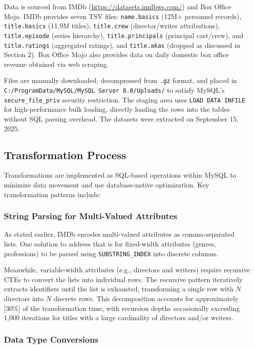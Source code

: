 Data is sourced from IMDb (\url{https://datasets.imdbws.com/}) and Box Office Mojo. IMDb provides seven TSV files: \texttt{name.basics} (12M+ personnel records), \texttt{title.basics} (11.9M titles), \texttt{title.crew} (director/writer attributions), \texttt{title.episode} (series hierarchy), \texttt{title.principals} (principal cast/crew), and \texttt{title.ratings} (aggregated ratings), and \texttt{title.akas} (dropped as discussed in Section 2). Box Office Mojo also provides data on daily domestic box office revenue obtained via web scraping.

Files are manually downloaded, decompressed from \texttt{.gz} format, and placed in \texttt{C:/ProgramData/MySQL/MySQL Server 8.0/Uploads/} to satisfy MySQL's \texttt{secure\_file\_priv} security restriction. The staging area uses \texttt{LOAD DATA INFILE} for high-performance bulk loading, directly loading the rows into the tables without SQL parsing overhead. The datasets were extracted on September 15, 2025.

\subsection{Transformation Process}

Transformations are implemented as SQL-based operations within MySQL to minimize data movement and use database-native optimization. Key transformation patterns include:

\subsubsection{String Parsing for Multi-Valued Attributes}

As stated earlier, IMDb encodes multi-valued attributes as comma-separated lists. One solution to address that is for fixed-width attributes (genres, professions) to be parsed using \texttt{SUBSTRING\_INDEX} into discrete columns.

Meanwhile, variable-width attributes (e.g., directors and writers) require recursive CTEs to convert the lists into individual rows. The recursive pattern iteratively extracts identifiers until the list is exhausted, transforming a single row with $N$ directors into $N$ discrete rows. This decomposition accounts for approximately [30\%] of the transformation time, with recursion depths occasionally exceeding 1,000 iterations for titles with a large cardinality of directors and/or writers.

\subsubsection{Data Type Conversions}

